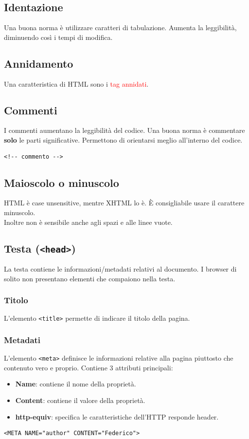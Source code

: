 \documentclass{article}
\begin{document}
\subsection{Identazione}
Una buona norma è utilizzare caratteri di tabulazione. Aumenta la leggibilità, diminuendo così i tempi di modifica.
\subsection{Annidamento} 
Una caratteristica di HTML sono i \textcolor{red}{tag annidati}.
\subsection{Commenti}
I commenti aumentano la leggibilità del codice. Una buona norma è commentare \textbf{solo} le parti significative. Permettono di orientarsi meglio all'interno del codice.
\begin{lstlisting}[style=htmlstyle]
<!-- commento -->
\end{lstlisting}
\subsection{Maioscolo o minuscolo}
HTML è case unsensitive, mentre XHTML lo è. È consigliabile usare il carattere minuscolo.
\\ Inoltre non è sensibile anche agli spazi e alle linee vuote.
\subsection{Testa (\texttt{<head>})}
La testa contiene le informazioni/metadati relativi al documento. I browser di solito non presentano elementi che compaiono nella testa.
\subsubsection{Titolo}
L'elemento \texttt{<title>} permette di indicare il titolo della pagina. 
\subsubsection{Metadati}
L'elemento \texttt{<meta>} definisce le informazioni relative alla pagina piuttosto che contenuto vero e proprio. Contiene 3 attributi principali:
\begin{itemize}
    \item \textbf{Name}: contiene il nome della proprietà.
    \item \textbf{Content}: contiene il valore della proprietà.
    \item \textbf{http-equiv}: specifica le caratteristiche dell'HTTP responde header.
\end{itemize}
\begin{lstlisting}[style=htmlstyle]
<META NAME="author" CONTENT="Federico">
\end{lstlisting}
\end{document}
